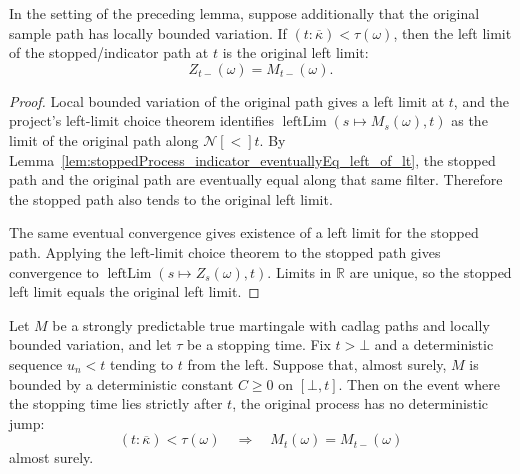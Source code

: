\begin{lemma}\label{lem:leftLim_stoppedProcess_indicator_eq_of_lt}
In the setting of the preceding lemma, suppose additionally that the original
sample path has locally bounded variation.  If
\((t:\overline{\kappa})<\tau(\omega)\), then the left limit of the
stopped/indicator path at \(t\) is the original left limit:
\[
  Z_{t-}(\omega)=M_{t-}(\omega).
\]
\end{lemma}

\begin{proof}
Local bounded variation of the original path gives a left limit at \(t\), and
the project's left-limit choice theorem identifies
\(\operatorname{leftLim}(s\mapsto M_s(\omega),t)\) as the limit of the
original path along \(\mathcal N[<]t\).  By
Lemma~\ref{lem:stoppedProcess_indicator_eventuallyEq_left_of_lt}, the stopped
path and the original path are eventually equal along that same filter.
Therefore the stopped path also tends to the original left limit.

The same eventual convergence gives existence of a left limit for the stopped
path.  Applying the left-limit choice theorem to the stopped path gives
convergence to
\(\operatorname{leftLim}(s\mapsto Z_s(\omega),t)\).  Limits in \(\mathbb R\)
are unique, so the stopped left limit equals the original left limit.
\end{proof}

\begin{lemma}\label{lem:Martingale.ae_eq_leftLim_on_event_of_left_approach_of_bound}
Let \(M\) be a strongly predictable true martingale with cadlag paths and
locally bounded variation, and let \(\tau\) be a stopping time.  Fix
\(t>\bot\) and a deterministic sequence \(u_n<t\) tending to \(t\) from the
left.  Suppose that, almost surely, \(M\) is bounded by a deterministic
constant \(C\ge0\) on \([\bot,t]\).  Then on the event where the stopping time
lies strictly after \(t\), the original process has no deterministic jump:
\[
  (t:\overline{\kappa})<\tau(\omega)
  \quad\Longrightarrow\quad
  M_t(\omega)=M_{t-}(\omega)
\]
almost surely.
\end{lemma}

